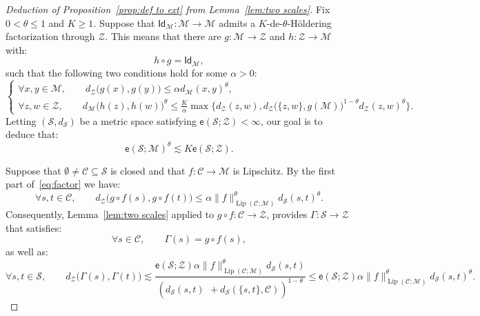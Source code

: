 \documentclass[11pt,reqno]{amsart}
\DeclareMathOperator{\Lip}{Lip}
\renewcommand{\le}{\leqslant}
\renewcommand{\ge}{\geqslant}
\renewcommand{\subset}{\subseteq}
\newcommand{\ee}{\mathsf{e}}
\newcommand{\cZ}{\mathcal{Z}}
\newcommand{\Id}{\mathsf{Id}}
\newcommand{\MM}{\mathcal{M}}
\renewcommand{\SS}{\mathscr{S}}
\newcommand{\sub}{\mathscr{C}}
\begin{document}
\begin{proof}[Deduction of Proposition~\ref{prop:def to ext}  from Lemma~\ref{lem:two scales}] Fix $0<\theta\le 1$ and $K\ge 1$. Suppose that  $\Id_\MM:\MM\to \MM$ admits a $K$-de-$\theta$-H\"oldering factorization through  $\cZ$. This means that there are $g:\MM\to \cZ$ and $h:\cZ\to \MM$ with: 
\begin{equation}\label{eq:composition identity}
h\circ g=\Id_\MM,
\end{equation} 
such that the following two conditions hold for some $\alpha>0$: 
\begin{equation}\label{eq:factor}
\left\{\begin{array}{ll}
\forall x,y\in \MM,\qquad d_\cZ\big(g(x),g(y)\big)\le \alpha d_\MM(x,y)^{\theta},\\ \forall z,w\in \cZ,\qquad d_\MM\big(h(z),h(w)\big)^\theta \le \frac{K}{\alpha}  \max \big\{d_\cZ(z,w),  d_\cZ\big(\{z,w\},g(\MM)\big)^{1-\theta}d_\cZ(z,w)^\theta\big\}.\end{array}\right. 
\end{equation}
 Letting $(\SS,d_\SS)$ be a metric space satisfying $\ee(\SS;\cZ)<\infty$, our goal is to deduce that:   
 \begin{equation}\label{eq:restate extension goal}
 \ee(\SS;\MM)^\theta\lesssim K\ee(\SS;\cZ).
 \end{equation} 

Suppose that  $\emptyset\neq \sub\subset \SS$ is closed and that $f:\sub\to \MM$ is Lipschitz. By the first part of~\eqref{eq:factor} we have:
$$
\forall s,t\in \sub,\qquad d_\cZ\big(g\circ f(s),g\circ f(t)\big)\le \alpha \|f\|_{\Lip(\sub;\MM)}^\theta d_\SS(s,t)^\theta. 
$$
Consequently,  Lemma~\ref{lem:two scales} applied to $g\circ f:\sub\to \cZ$, provides $\Gamma:\SS\to \cZ$  that satisfies:
\begin{equation}\label{eq:Gamma composition}
\forall s\in \sub,\qquad \Gamma(s)=g\circ f(s),
\end{equation}
as well as: 
\begin{equation}\label{eq:Gamma}
\forall s,t\in \SS,\qquad  d_\cZ\big(\Gamma(s),\Gamma(t)\big)\lesssim   \frac{\ee(\SS;\cZ)\alpha \|f\|_{\Lip(\sub;\MM)}^\theta d_\SS(s,t) }{\left(d_\SS(s,t)^{\phantom{2}}\!\!\!\!+d_\SS(\{s,t\},\sub)\right)^{1-\theta}}\le \ee(\SS;\cZ)\alpha \|f\|_{\Lip(\sub;\MM)}^\theta d_\SS(s,t)^\theta.
\end{equation}


\end{proof}
\end{document}
